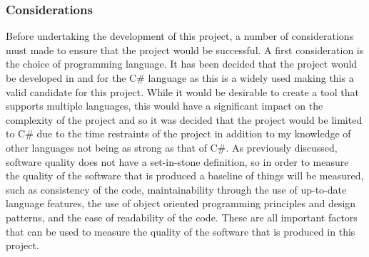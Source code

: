 \subsubsection{Considerations}
\label{sec:Considerations}

Before undertaking the development of this project, a number of considerations must made to ensure that the project would be successful. A first consideration is the choice of programming language. It has been decided that the project would be developed in and for the C\# language as this is a widely used making this a valid candidate for this project. While it would be desirable to create a tool that supports multiple languages, this would have a significant impact on the complexity of the project and so it was decided that the project would be limited to C\# due to the time restraints of the project in addition to my knowledge of other languages not being as strong as that of C\#.
As previously discussed, software quality does not have a set-in-stone definition, so in order to measure the quality of the software that is produced a baseline of things will be measured, such as consistency of the code, maintainability through the use of up-to-date language features, the use of object oriented programming principles and design patterns, and the ease of readability of the code. These are all important factors that can be used to measure the quality of the software that is produced in this project.
